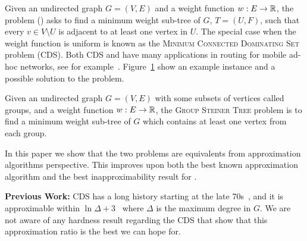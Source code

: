 % 

Given an undirected graph $G = (V, E)$ and a weight function $w:E \to \mathbb{R}$, 
the \Problem{} problem (\Prob{}) asks to find a minimum weight sub-tree of $G$, 
$T = (U, F)$, such that every $v \in V \setminus U$ is adjacent to at least one 
vertex in $U$.
The special case when the weight function is uniform is known as the 
\textsc{Minimum Connected Dominating Set} problem (CDS). 
Both CDS and \Prob{} have many applications in routing
for mobile ad-hoc networks, see for 
example~\cite{shin2010approximation,cheng2003polynomial,das1997routing,adasme2016models,adasme2017minimum}.
Figure~\ref{fig:problem} show an example instance and a possible solution to the problem. 

\begin{figure}
\begin{center}

\end{center}
\caption{\label{fig:problem}}
\end{figure}

Given an undirected graph $G = (V, E)$ with some subsets of vertices called groups,
and a weight function $w:E \to \mathbb{R}$,
the \textsc{Group Steiner Tree} problem is to find a minimum weight sub-tree
of $G$ which contains at least one vertex from each group. 

In this paper we show that the two problems are equivalents 
from approximation algorithms perspective.
This improves upon both the best known approximation algorithm and the best 
inapproximability result for \Prob{}.

\textbf{Previous Work:}
CDS has a long history starting at the late 70s~\cite{sampathkumar1979connected},
and it is approximable within $\ln\Delta + 3$~\cite{guha1998approximation} 
where $\Delta$ is the maximum degree in $G$.
We are not aware of any hardness result regarding the CDS that show that this approximation
ratio is the best we can hope for.

